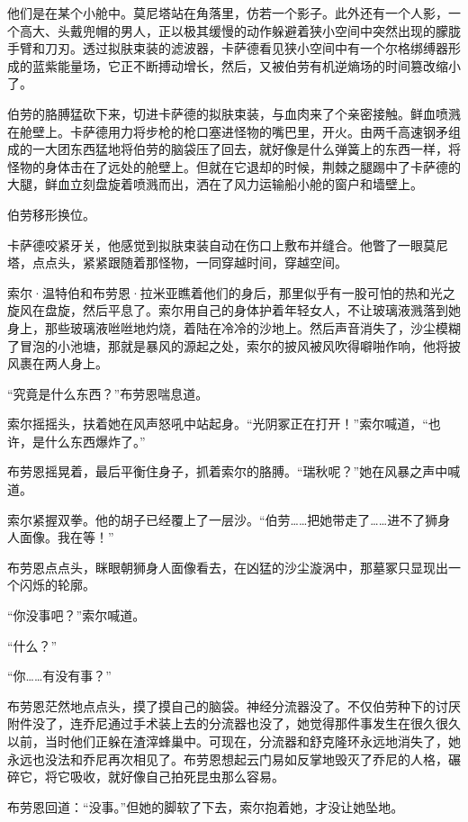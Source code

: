 \documentclass[AutoFakeBold=true]{book}
\begin{document}
他们是在某个小舱中。莫尼塔站在角落里，仿若一个影子。此外还有一个人影，一个高大、头戴兜帽的男人，正以极其缓慢的动作躲避着狭小空间中突然出现的朦胧手臂和刀刃。透过拟肤束装的滤波器，卡萨德看见狭小空间中有一个尔格绑缚器形成的蓝紫能量场，它正不断搏动增长，然后，又被伯劳有机逆熵场的时间篡改缩小了。

伯劳的胳膊猛砍下来，切进卡萨德的拟肤束装，与血肉来了个亲密接触。鲜血喷溅在舱壁上。卡萨德用力将步枪的枪口塞进怪物的嘴巴里，开火。由两千高速钢矛组成的一大团东西猛地将伯劳的脑袋压了回去，就好像是什么弹簧上的东西一样，将怪物的身体击在了远处的舱壁上。但就在它退却的时候，荆棘之腿踢中了卡萨德的大腿，鲜血立刻盘旋着喷溅而出，洒在了风力运输船小舱的窗户和墙壁上。

伯劳移形换位。

卡萨德咬紧牙关，他感觉到拟肤束装自动在伤口上敷布并缝合。他瞥了一眼莫尼塔，点点头，紧紧跟随着那怪物，一同穿越时间，穿越空间。

\vspace*{1em}

索尔·温特伯和布劳恩·拉米亚瞧着他们的身后，那里似乎有一股可怕的热和光之旋风在盘旋，然后平息了。索尔用自己的身体护着年轻女人，不让玻璃液溅落到她身上，那些玻璃液咝咝地灼烧，着陆在冷冷的沙地上。然后声音消失了，沙尘模糊了冒泡的小池塘，那就是暴风的源起之处，索尔的披风被风吹得噼啪作响，他将披风裹在两人身上。

``究竟是什么东西？''布劳恩喘息道。

索尔摇摇头，扶着她在风声怒吼中站起身。``光阴冢正在打开！''索尔喊道，``也许，是什么东西爆炸了。''

布劳恩摇晃着，最后平衡住身子，抓着索尔的胳膊。``瑞秋呢？''她在风暴之声中喊道。

索尔紧握双拳。他的胡子已经覆上了一层沙。``伯劳……把她带走了……进不了狮身人面像。我在等！''

布劳恩点点头，眯眼朝狮身人面像看去，在凶猛的沙尘漩涡中，那墓冢只显现出一个闪烁的轮廓。

``你没事吧？''索尔喊道。

``什么？''

``你……有没有事？''

布劳恩茫然地点点头，摸了摸自己的脑袋。神经分流器没了。不仅伯劳种下的讨厌附件没了，连乔尼通过手术装上去的分流器也没了，她觉得那件事发生在很久很久以前，当时他们正躲在渣滓蜂巢中。可现在，分流器和舒克隆环永远地消失了，她永远也没法和乔尼再次相见了。布劳恩想起云门易如反掌地毁灭了乔尼的人格，碾碎它，将它吸收，就好像自己拍死昆虫那么容易。

布劳恩回道：``没事。''但她的脚软了下去，索尔抱着她，才没让她坠地。
\end{document}
